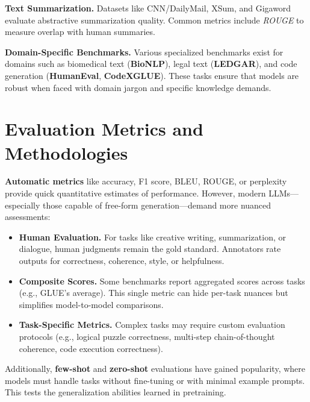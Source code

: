 \textbf{Text Summarization.} Datasets like CNN/DailyMail, XSum, and Gigaword evaluate abstractive summarization quality. Common metrics include \textit{ROUGE} to measure overlap with human summaries.

\textbf{Domain-Specific Benchmarks.} Various specialized benchmarks exist for domains such as biomedical text (\textbf{BioNLP}), legal text (\textbf{LEDGAR}), and code generation (\textbf{HumanEval}, \textbf{CodeXGLUE}). These tasks ensure that models are robust when faced with domain jargon and specific knowledge demands.

\section{Evaluation Metrics and Methodologies}
\noindent
\textbf{Automatic metrics} like accuracy, F1 score, BLEU, ROUGE, or perplexity provide quick quantitative estimates of performance. However, modern LLMs—especially those capable of free-form generation—demand more nuanced assessments:
\begin{itemize}
    \item \textbf{Human Evaluation.} For tasks like creative writing, summarization, or dialogue, human judgments remain the gold standard. Annotators rate outputs for correctness, coherence, style, or helpfulness.
    \item \textbf{Composite Scores.} Some benchmarks report aggregated scores across tasks (e.g., GLUE’s average). This single metric can hide per-task nuances but simplifies model-to-model comparisons.
    \item \textbf{Task-Specific Metrics.} Complex tasks may require custom evaluation protocols (e.g., logical puzzle correctness, multi-step chain-of-thought coherence, code execution correctness).
\end{itemize}

\noindent
Additionally, \textbf{few-shot} and \textbf{zero-shot} evaluations have gained popularity, where models must handle tasks without fine-tuning or with minimal example prompts. This tests the generalization abilities learned in pretraining.

